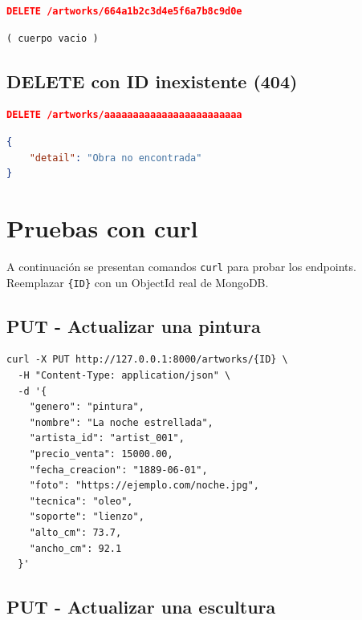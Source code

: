\documentclass[12pt,a4paper]{article}
\begin{document}
\begin{lstlisting}[language=json, caption=Petición]
DELETE /artworks/664a1b2c3d4e5f6a7b8c9d0e
\end{lstlisting}

\begin{lstlisting}[caption=Respuesta 204 No Content]
( cuerpo vacio )
\end{lstlisting}

\subsection{DELETE con ID inexistente (404)}

\begin{lstlisting}[language=json, caption=Petición]
DELETE /artworks/aaaaaaaaaaaaaaaaaaaaaaaa
\end{lstlisting}

\begin{lstlisting}[language=json, caption=Respuesta 404]
{
    "detail": "Obra no encontrada"
}
\end{lstlisting}

\section{Pruebas con curl}

A continuación se presentan comandos \texttt{curl} para probar los endpoints.
Reemplazar \texttt{\{ID\}} con un ObjectId real de MongoDB.

\subsection{PUT - Actualizar una pintura}

\begin{lstlisting}[style=bash, caption=Actualizar pintura]
curl -X PUT http://127.0.0.1:8000/artworks/{ID} \
  -H "Content-Type: application/json" \
  -d '{
    "genero": "pintura",
    "nombre": "La noche estrellada",
    "artista_id": "artist_001",
    "precio_venta": 15000.00,
    "fecha_creacion": "1889-06-01",
    "foto": "https://ejemplo.com/noche.jpg",
    "tecnica": "oleo",
    "soporte": "lienzo",
    "alto_cm": 73.7,
    "ancho_cm": 92.1
  }'
\end{lstlisting}

\subsection{PUT - Actualizar una escultura}
\end{document}
